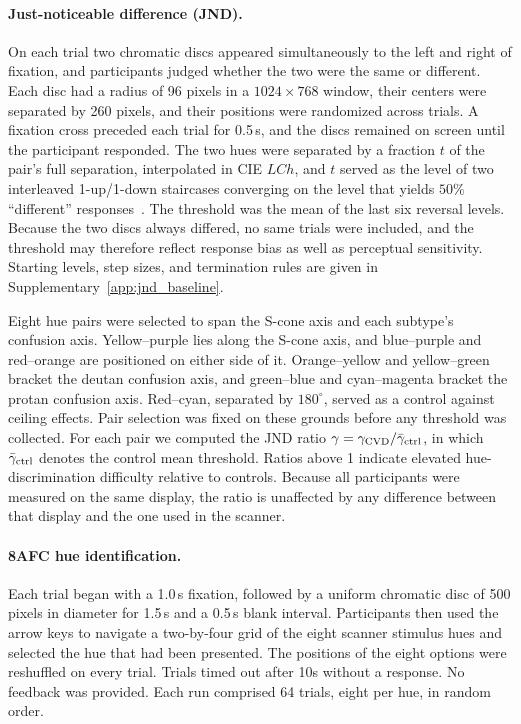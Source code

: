 \paragraph{Just-noticeable difference (JND).}
On each trial two chromatic discs appeared simultaneously to the left and right of fixation, and participants judged whether the two were the same or different. Each disc had a radius of 96 pixels in a $1024 \times 768$ window, their centers were separated by 260 pixels, and their positions were randomized across trials. A fixation cross preceded each trial for 0.5\,s, and the discs remained on screen until the participant responded. The two hues were separated by a fraction $t$ of the pair's full separation, interpolated in CIE $LCh$, and $t$ served as the level of two interleaved 1-up/1-down staircases converging on the level that yields $50\%$ ``different'' responses~\parencite{levitt1971}. The threshold was the mean of the last six reversal levels. Because the two discs always differed, no same trials were included, and the threshold may therefore reflect response bias as well as perceptual sensitivity. Starting levels, step sizes, and termination rules are given in Supplementary~\cref{app:jnd_baseline}.

Eight hue pairs were selected to span the S-cone axis and each subtype's confusion axis. Yellow--purple lies along the S-cone axis, and blue--purple and red--orange are positioned on either side of it. Orange--yellow and yellow--green bracket the deutan confusion axis, and green--blue and cyan--magenta bracket the protan confusion axis. Red--cyan, separated by $180^\circ$, served as a control against ceiling effects. Pair selection was fixed on these grounds before any threshold was collected. For each pair we computed the JND ratio $\gamma = \gamma_{\rm CVD} / \bar{\gamma}_{\rm ctrl}$, in which $\bar{\gamma}_{\rm ctrl}$ denotes the control mean threshold. Ratios above 1 indicate elevated hue-discrimination difficulty relative to controls. Because all participants were measured on the same display, the ratio is unaffected by any difference between that display and the one used in the scanner.

\paragraph{8AFC hue identification.}
Each trial began with a 1.0\,s fixation, followed by a uniform chromatic disc of 500 pixels in diameter for 1.5\,s and a 0.5\,s blank interval. Participants then used the arrow keys to navigate a two-by-four grid of the eight scanner stimulus hues and selected the hue that had been presented. The positions of the eight options were reshuffled on every trial. Trials timed out after 10s without a response. No feedback was provided. Each run comprised 64 trials, eight per hue, in random order. 

